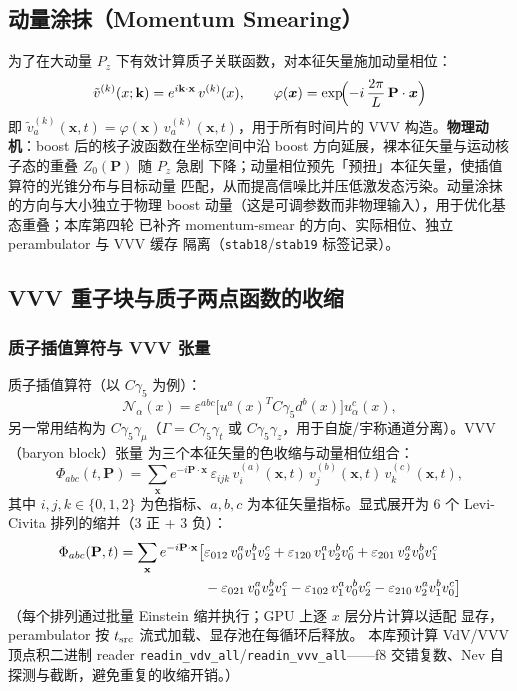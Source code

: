 \documentclass[11pt,a4paper]{ctexart}
\newcommand{\eps}{\varepsilon}
\newcommand{\code}[1]{\texttt{#1}}
\begin{document}
\subsection{动量涂抹（Momentum Smearing）}

为了在大动量 $P_z$ 下有效计算质子关联函数，对本征矢量施加动量相位：
\begin{equation}\label{eq:momsmear}
\tilde{v}^{(k)}(x; \mathbf{k}) = e^{i \mathbf{k} \cdot \mathbf{x}} \,
v^{(k)}(x),
\qquad \varphi(\boldsymbol x) = \exp\!\Bigl(
-i\,\frac{2\pi}{L}\,\mathbf{P}\cdot\boldsymbol x \Bigr)
\end{equation}
即 $\tilde v^{(k)}_a(\boldsymbol x,t)
=\varphi(\boldsymbol x)\,v^{(k)}_a(\boldsymbol x,t)$，用于所有时间片的
VVV 构造。\textbf{物理动机}：boost 后的核子波函数在坐标空间中沿 boost
方向延展，裸本征矢量与运动核子态的重叠 $Z_0(\mathbf P)$ 随 $P_z$ 急剧
下降；动量相位预先「预扭」本征矢量，使插值算符的光锥分布与目标动量
匹配，从而提高信噪比并压低激发态污染。动量涂抹的方向与大小独立于物理
boost 动量（这是可调参数而非物理输入），用于优化基态重叠；本库第四轮
已补齐 momentum-smear 的方向、实际相位、独立 perambulator 与 VVV 缓存
隔离（\code{stab18}/\code{stab19} 标签记录）。

\subsection{VVV 重子块与质子两点函数的收缩}

\subsubsection{质子插值算符与 VVV 张量}

质子插值算符（以 $C\gamma_5$ 为例）：
\begin{equation}
\mathcal{N}_\alpha(x) = \varepsilon^{abc}
\bigl[ u^{a}(x)^T C\gamma_5 d^{b}(x) \bigr] u^{c}_\alpha(x),
\end{equation}
另一常用结构为 $C\gamma_5\gamma_\mu$（$\Gamma=C\gamma_5\gamma_t$ 或
$C\gamma_5\gamma_z$，用于自旋/宇称通道分离）。VVV（baryon block）张量
为三个本征矢量的色收缩与动量相位组合：
\begin{equation}\label{eq:vvv}
\Phi_{abc}(t, \mathbf{P}) = \sum_{\mathbf{x}} e^{-i\mathbf{P}\cdot\mathbf{x}}
\, \varepsilon_{ijk} \, v^{(a)}_i(\mathbf{x}, t) \,
v^{(b)}_j(\mathbf{x}, t) \, v^{(c)}_k(\mathbf{x}, t),
\end{equation}
其中 $i,j,k\in\{0,1,2\}$ 为色指标、$a,b,c$ 为本征矢量指标。显式展开为
6 个 Levi-Civita 排列的缩并（3 正 + 3 负）：
\begin{align}
\Phi_{abc}(\mathbf P,t) = \sum_{\mathbf x} e^{-i\mathbf P\cdot\mathbf x}
\bigl[
& \eps_{012}\, v_0^a v_1^b v_2^c + \eps_{120}\, v_1^a v_2^b v_0^c
+ \eps_{201}\, v_2^a v_0^b v_1^c \notag\\
&- \eps_{021}\, v_0^a v_2^b v_1^c - \eps_{102}\, v_1^a v_0^b v_2^c
- \eps_{210}\, v_2^a v_1^b v_0^c
\bigr]
\label{eq:vvv-permutations}
\end{align}
（每个排列通过批量 Einstein 缩并执行；GPU 上逐 $x$ 层分片计算以适配
显存，perambulator 按 $t_{\rm src}$ 流式加载、显存池在每循环后释放。
本库预计算 VdV/VVV 顶点积二进制 reader
\code{readin\_vdv\_all}/\code{readin\_vvv\_all}——f8 交错复数、Nev 自
探测与截断，避免重复的收缩开销。）
\end{document}
